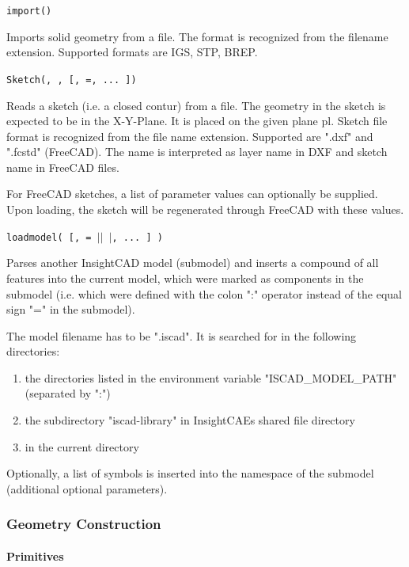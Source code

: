 \texttt{import()}

Imports solid geometry from a file. The format is recognized from the
filename extension. Supported formats are IGS, STP, BREP.

\texttt{Sketch(, ,  [, =, ... ])}

Reads a sketch (i.e. a closed contur) from a file. The geometry in the
sketch is expected to be in the X-Y-Plane. It is placed on the given
plane pl. Sketch file format is recognized from the file name
extension. Supported are ".dxf" and ".fcstd" (FreeCAD). The name is
interpreted as layer name in DXF and sketch name in FreeCAD files.

For FreeCAD sketches, a list of parameter values can optionally be
supplied. Upon loading, the sketch will be regenerated through FreeCAD
with these values.

\texttt{loadmodel(  [,  = $|$$|$ $|$, ... ] )}

Parses another InsightCAD model (submodel) and inserts a
compound of all features into the current model, which were marked as
components in the submodel (i.e. which were defined with the colon ":"
operator instead of the equal sign "=" in the submodel).

The model filename has to be ".iscad". It is searched
for in the following directories:

\begin{enumerate}
\item the directories listed in the environment variable
    "ISCAD\_MODEL\_PATH" (separated by ":")
\item the subdirectory "iscad-library" in InsightCAEs shared file
    directory
\item in the current directory
\end{enumerate}

Optionally, a list of symbols is inserted into the namespace of the
submodel (additional optional parameters).

\subsubsection{Geometry Construction}

\paragraph{Primitives}

